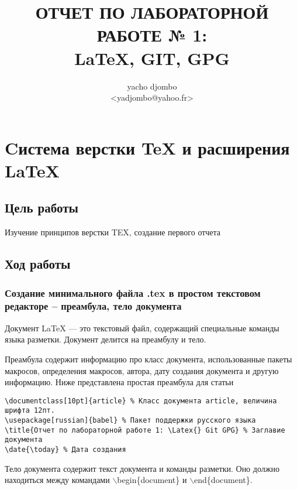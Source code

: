 \documentclass[10pt,a4paper]{article}
\author{yacho djombo\\<yadjombo@yahoo.fr>}
\title{ОТЧЕТ ПО ЛАБОРАТОРНОЙ РАБОТЕ № 1: \\\LaTeX{}, GIT, GPG}
\begin{document}
\maketitle

\newpage
\tableofcontents{}
\section{Cистема верстки \TeX{} и расширения \LaTeX{}}
\subsection{Цель работы}
Изучение принципов верстки TEX, создание первого отчета
\subsection{Ход работы}
\subsubsection{Создание минимального файла .tex в простом текстовом редакторе – преамбула, тело документа}


Документ LaTeX — это текстовый файл, содержащий специальные команды языка разметки. Документ делится на преамбулу и тело.

Преамбула содержит информацию про класс документа, использованные пакеты макросов, определения макросов, автора, дату создания документа и другую информацию. Ниже представлена простая преамбула для статьи
\begin{Verbatim}[xleftmargin=.5in,fontsize=\small]
\documentclass[10pt]{article} % Класс документа article, величина шрифта 12пт.
\usepackage[russian]{babel} % Пакет поддержки русского языка
\title{Отчет по лабораторной работе 1: \Latex{} Git GPG} % Заглавие документа
\date{\today} % Дата создания
\end{Verbatim}

Тело документа содержит текст документа и команды разметки. Оно должно находиться между командами $\backslash$begin\{document\} и $\backslash$end\{document\}.
\end{document}
